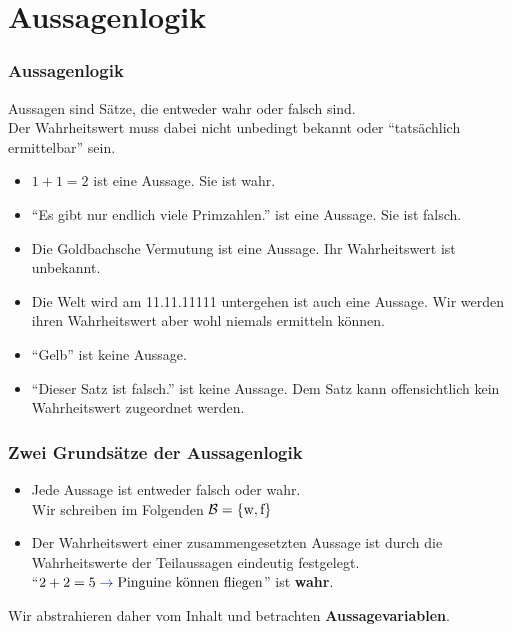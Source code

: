\section{Aussagenlogik}

\begin{frame}
	\frametitle{Aussagenlogik}
	Aussagen sind Sätze, die entweder wahr oder falsch sind.\\
	Der Wahrheitswert muss dabei nicht unbedingt bekannt oder \enquote{tatsächlich ermittelbar} sein.
	
	\pause
	\begin{Beispiel}
		\begin{itemize}
			\item $ 1 + 1 = 2 $ ist eine Aussage. Sie ist wahr.
			\item \enquote{Es gibt nur endlich viele Primzahlen.} ist eine Aussage. Sie ist falsch.
			\pause
			\item Die Goldbachsche Vermutung ist eine Aussage. Ihr Wahrheitswert ist unbekannt.
			\pause
			\item Die Welt wird am 11.11.11111 untergehen ist auch eine Aussage. Wir werden ihren Wahrheitswert aber wohl niemals ermitteln können.
			\pause
			\item \enquote{Gelb} ist keine Aussage.
			\pause
			\item \enquote{Dieser Satz ist falsch.} ist keine Aussage. Dem Satz kann offensichtlich kein Wahrheitswert zugeordnet werden.
		\end{itemize}
	\end{Beispiel}
\end{frame}

\begin{frame}
	\frametitle{Zwei Grundsätze der Aussagenlogik}
	
	\begin{itemize}
		\pause
		\item Jede Aussage ist entweder falsch oder wahr.\\
		Wir schreiben im Folgenden $\mathcal{B}= \{\text{w}, \text{f}\}$
		\pause
		\item Der Wahrheitswert einer zusammengesetzten Aussage ist durch die
		Wahrheitswerte der Teilaussagen eindeutig festgelegt. \\
		\enquote{$2 + 2 = 5 \; \textcolor{blue}{\to}\text{} \; \text{Pinguine können fliegen}$} ist \textbf{wahr}.\\[0.2em]
	\end{itemize}

	Wir abstrahieren daher vom Inhalt und betrachten \textbf{Aussagevariablen}.
\end{frame}

